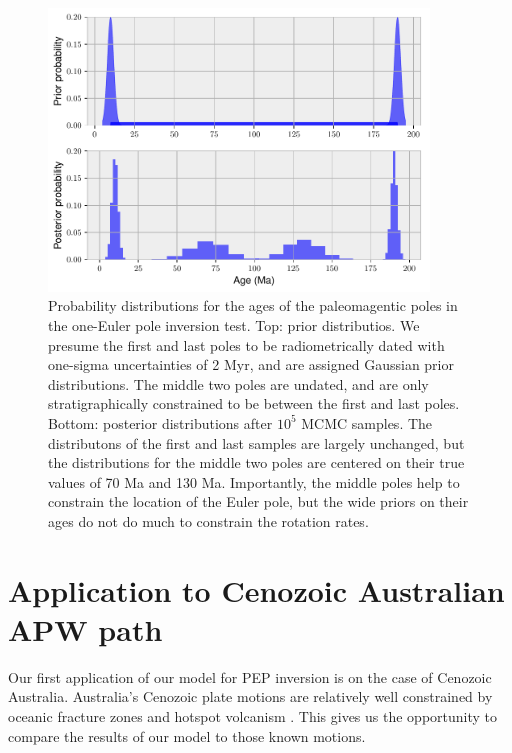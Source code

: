 \documentclass[preprint,12pt,authoryear]{elsarticle}
\begin{document}
\begin{figure}
\includegraphics[width=0.9\textwidth]{figures/synthetic/age_uncertainty_samples.pdf}
\caption[Probability distributions for ages of the paleomagnetic poles in the one-Euler pole inversion test.]{Probability distributions for the ages of the paleomagentic poles in the one-Euler pole inversion test. Top: prior distributios. We presume the first and last poles to be radiometrically dated with one-sigma uncertainties of 2 Myr, and are assigned Gaussian prior distributions. The middle two poles are undated, and are only stratigraphically constrained to be between the first and last poles. Bottom: posterior distributions after $10^5$ MCMC samples. The distributons of the first and last samples are largely unchanged, but the distributions for the middle two poles are centered on their true values of 70 Ma and 130 Ma. Importantly, the middle poles help to constrain the location of the Euler pole, but the wide priors on their ages do not do much to constrain the rotation rates.}
\label{fig:age_uncertainty_samples}
\end{figure}

\section{Application to Cenozoic Australian APW path}
\label{sec:australia}
\clearpage
Our first application of our model for PEP inversion is on the case of Cenozoic Australia.
Australia's Cenozoic plate motions are relatively well constrained by oceanic fracture zones
and hotspot volcanism \citep{muller1993revised, seton2012global}.
This gives us the opportunity to compare the results of our model to those known motions.
\end{document}
